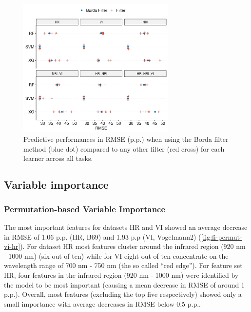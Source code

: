 \documentclass[remotesensing,article,submit,moreauthors,pdftex]{Definitions/mdpi}
\begin{document}
\begin{figure} [t!]
	\centering
	\begin{center}
		\includegraphics[width=0.7\textwidth] {filter-effect-all-vs-borda-filter-1.pdf}
		\caption{Predictive performances in RMSE (p.p.) when using the Borda filter method (blue dot) compared to any other filter (red cross) for each learner across all tasks.}\label{fig:filter-effects-borda}
	\end{center}
\end{figure}

\subsection{Variable importance}

\subsubsection{Permutation-based Variable Importance}


The most important features for datasets HR and VI showed an average decrease in RMSE of 1.06 p.p. (HR, B69) and 1.93 p.p (VI, Vogelmann2) (\autoref{fig:fi-permut-vi-hr}).
For dataset HR most features cluster around the infrared region (920 nm - 1000 nm) (six out of ten) while for VI eight out of ten concentrate on the wavelength range of 700 nm - 750 nm (the so called \enquote{red edge}).
For feature set HR, four features in the infrared region (920 nm - 1000 nm) were identified by the model to be most important (causing a mean decrease in RMSE of around 1 p.p.).
Overall, most features (excluding the top five respectively) showed only a small importance with average decreases in RMSE below 0.5 p.p..
\end{document}
